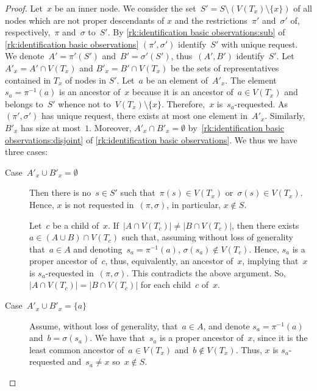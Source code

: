 \documentclass{lmcs} %
\newcommand{\card}[1]{\ensuremath{\left|#1\right|}}
\begin{document}
\begin{proof}
    Let~$x$ be an inner node.
    We consider the set~$S'=S\setminus(V(T_x)\setminus\{x\})$ of all nodes which are not proper descendants of $x$
    and the restrictions~$\pi'$ and~$\sigma'$ of, respectively,~$\pi$ and~$\sigma$ to~$S'$.
    By \autoref{rk:identification basic observations:sub} of \autoref{rk:identification basic observations}
    $(\pi',\sigma')$ identify~$S'$ with unique request.
    We denote~$A'=\pi'(S')$ and~$B'=\sigma'(S')$, thus~$(A',B')$ identify~$S'$.
    Let $A'_x=A'\cap V(T_x)$ and $B'_x=B'\cap V(T_x)$ be the sets of representatives contained in $T_x$ of nodes in $S'$.
    Let~$a$ be an element of~$A'_x$.
    The element~$s_a=\pi^{-1}(a)$ is an ancestor of~$x$
    because it is an ancestor of~$a\in V(T_x)$
    and belongs to~$S'$ whence not to~$V(T_x)\setminus\{x\}$.
    Therefore,~$x$ is~$s_a$-requested.
    As~$(\pi',\sigma')$ has unique request,
    there exists at most one element in~$A'_x$.
    Similarly, $B'_x$ has size at most~$1$.
    Moreover, $A'_x\cap B'_x=\emptyset$
    by~\autoref{rk:identification basic observations:disjoint} of \autoref{rk:identification basic observations}.
    We thus we have three cases:
    \begin{description}
        \item[Case~$A'_x\cup B'_x=\emptyset$]
            Then there is no~$s\in S'$ such that~$\pi(s)\in V(T_x)$ or~$\sigma(s)\in V(T_x)$.
            Hence, $x$ is not requested in~$(\pi,\sigma)$, in particular, $x\notin S$.

            Let~$c$ be a child of~$x$.
            If~$\card{A\cap V(T_{c})}\neq\card{B\cap V(T_c)}$,
            then there exists~$a\in(A\cup B)\cap V(T_{c})$
            such that,
            assuming without loss of generality that~$a\in A$ and denoting~$s_a=\pi^{-1}(a)$,
            $\sigma(s_a)\notin V(T_{c})$.
            Hence, $s_a$ is a proper ancestor of~$c$,
            thus, equivalently, an ancestor of~$x$,
            implying that~$x$ is $s_a$-requested in~$(\pi,\sigma)$.
            This contradicts the above argument.
            So, $\card{A\cap V(T_c)}=\card{B\cap V(T_c)}$ for each child~$c$ of~$x$.
        \item[Case~$A'_x\cup B'_x=\{a\}$]
            Assume, without loss of generality, that~$a\in A$,
            and denote $s_a=\pi^{-1}(a)$ and~$b=\sigma(s_a)$.
            We have that~$s_a$ is a proper ancestor of~$x$,
            since it is the least common ancestor of~$a\in V(T_x)$ and~$b\notin V(T_x)$.
            Thus, $x$ is $s_a$-requested and~$s_a\neq x$ so~$x\notin S$.


\end{description}
\end{proof}
\end{document}

